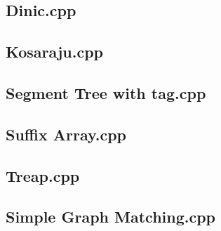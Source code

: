 \subsection{Dinic.cpp}

\subsection{Kosaraju.cpp}

\subsection{Segment Tree with tag.cpp}

\subsection{Suffix Array.cpp}

\subsection{Treap.cpp}

\subsection{Simple Graph Matching.cpp}


